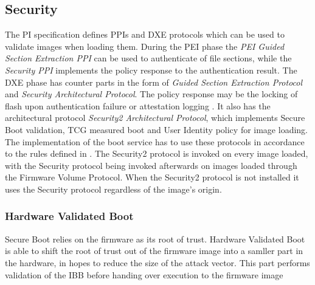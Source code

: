
\subsection{Security}
\label{sec:uefi-pi:pi:security}

The \ac{PI} specification defines \acp{PPI} and \ac{DXE} protocols which can be used to validate images when loading them.
During the \ac{PEI} phase the \emph{\ac{PEI} Guided Section Extraction \ac{PPI}} can be used to authenticate of file sections, while the \emph{Security \ac{PPI}} implements the policy response to the authentication result.
The \ac{DXE} phase has counter parts in the form of \emph{Guided Section Extraction Protocol} and \emph{Security Architectural Protocol}.
The policy response may be the locking of flash upon authentication failure or attestation logging \cite[Vol. 2, Section 12.9.1]{pi-spec}.
It also has the architectural protocol \emph{Security2 Architectural Protocol}, which implements Secure Boot validation, \ac{TCG} measured boot and User Identity policy for image loading.
The implementation of the boot service  has to use these protocols in accordance to the rules defined in \cite[Vol. 2, Section 12.9.2]{pi-spec}.
The Security2 protocol is invoked on every image loaded, with the Security protocol being invoked afterwards on images loaded through the Firmware Volume Protocol.
When the Security2 protocol is not installed it uses the Security protocol regardless of the image's origin.


\subsubsection{Hardware Validated Boot}

Secure Boot relies on the firmware as its root of trust.
Hardware Validated Boot is able to shift the root of trust out of the firmware image into a samller part in the hardware, in hopes to reduce the size of the attack vector.
This part performs validation of the \ac{IBB} before handing over execution to the firmware image %


